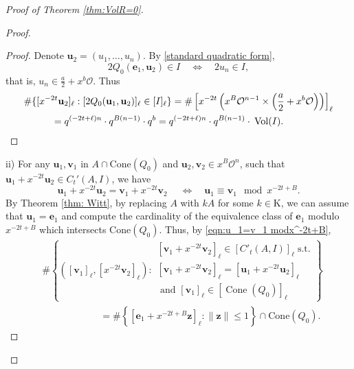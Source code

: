 \documentclass[11pt,a4paper,reqno]{amsart}
\def\vol{\mathrm{Vol}}
\newcommand{\Cone}{\mathrm{Cone}}
\theoremstyle{definition}
\theoremstyle{remark}
\numberwithin{equation}{section}
\begin{document}
\begin{proof}[Proof of Theorem \ref{thm:VolR=0}]
\begin{proof}
\begin{proof}
Denote $\mathbf u_2=(u_1, \ldots, u_n)$. By \eqref{standard quadratic form},
\[
2Q_0(\mathbf e_1, \mathbf u_2)\in I
\quad\Leftrightarrow\quad
2u_n\in I,
\]
that is, $u_n\in \frac a 2  + x^{b}\mathcal O$. Thus 
\[\begin{split}
&\#\{[x^{-2t}\mathbf u_2]_\ell: [2Q_0( \mathbf u_1, \mathbf u_2)]_{\ell}\in [I]_{\ell}\}
=\#\left[x^{-2t}\left(x^B\mathcal O^{n-1}\times \left(\frac a 2 +x^{b}\mathcal O\right)\right)\right]_{\ell}\\
&\hspace{0.4in}=q^{(-2t+\ell)n}\cdot q^{B(n-1)} \cdot q^{b}=q^{(-2t+\ell)n}\cdot q^{B(n-1)} \cdot \:\vol(I).
\end{split}\]
\end{proof}

\vspace{0.1in}
\noindent ii) For any $\mathbf u_1,\mathbf v_1$ in $A\cap \Cone(Q_0)$ and $\mathbf{u}_2,\mathbf{v}_2\in x^B\mathcal{O}^n$, such that $\mathbf{u}_1+x^{-2t}\mathbf{u}_2\in C_t'(A,I)$, we have
\begin{equation}
\label{eqn:u_1=v_1 modx^-2t+B}
\mathbf u_1 + x^{-2t}\mathbf u_2=\mathbf v_1 + x^{-2t}\mathbf v_2\;
\quad\Leftrightarrow\quad
\mathbf u_1\equiv \mathbf v_1 \mod x^{-2t+B}.
\end{equation}
By Theorem \ref{thm: Witt}, by replacing $A$ with $kA$ for some $k\in \mathrm{K}$, we can assume that $\mathbf u_1=\mathbf e_1$ and compute the cardinality of the equivalence class of $\mathbf e_1$ modulo $x^{-2t+B}$ which intersects $\Cone(Q_0)$. Thus, by \eqref{eqn:u_1=v_1 modx^-2t+B},
\begin{equation}\label{eqn 2: volume estimate1}\begin{split}
&\# \left\{\left([\mathbf v_1]_{\ell},[x^{-2t}\mathbf v_2]_\ell\right): \begin{array}{c}
[\mathbf v_1+x^{-2t}\mathbf v_2]_{\ell}\in [C'_t(A,I)]_{\ell}\;\text{s.t.}\\[0.05in]
[\mathbf v_1+x^{-2t}\mathbf v_2]_{\ell}=[\mathbf u_1+x^{-2t}\mathbf u_2]_{\ell}\\
\text{ and } [\mathbf{v}_1]_{\ell}\in [\operatorname{Cone}(Q_0)]_{\ell}\end{array}\right\}\\[0.05in]
&\hspace{1in}=\#\left\{[ \mathbf e_1+x^{-2t+B}\mathbf z]_\ell: \|\mathbf z\|\le 1 \right\}\cap \Cone(Q_0).
\end{split}\end{equation}


\end{proof}
\end{proof}
\end{document}
